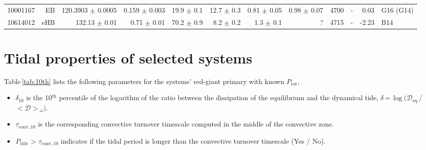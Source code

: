 \begin{landscape}
\begin{longtable}{rrrrrrrrrrrl}
	10001167	&	EB	&	120.3903	$\pm$	0.0005	&	0.159	$\pm$	0.003	&	19.9	$\pm$	0.1	&		12.7	$\pm$	0.3	&		0.81	$\pm$	0.05	&	0.98	$\pm$	0.07	&	4700	&	-	&	0.03	&	G16 (G14)	\\	%
	10614012	&	eHB	&	132.13	$\pm$	0.01	&	0.71	$\pm$	0.01	&	70.2	$\pm$	0.9	&		8.2	$\pm$	0.2	&		1.3	$\pm$	0.1	&	?			&	4715	&	-	&	-2.23	&	B14	\\	%
						
						\hline
\end{longtable}
\end{landscape}




\section{Tidal properties of selected systems}

Table\,\ref{tab:10th} lists the following parameters for the systems' red-giant primary with known $P_{\mathrm{rot}}$,
\begin{itemize}
\item $\delta_{\mathrm{10}}$ is the 10$^{\mathrm{th}}$ percentile of the logarithm of the ratio between the dissipation of the equilibrium and the dynamical tide, $\delta$\,=\,$\log (\mathcal{D}_{\mathrm{eq}}$\,/\,$<$$\mathcal{D}$$>$$_\omega)$.
\item $\tau_{\mathrm{conv,10}}$ is the corresponding convective turnover timescale computed in the middle of the convective zone.
\item $P_{\mathrm{tide}}$ > $\tau_{\mathrm{conv,10}}$ indicates if the tidal period is longer than the convective turnover timescale  (Yes / No).

\end{itemize}
\vspace {5mm}

